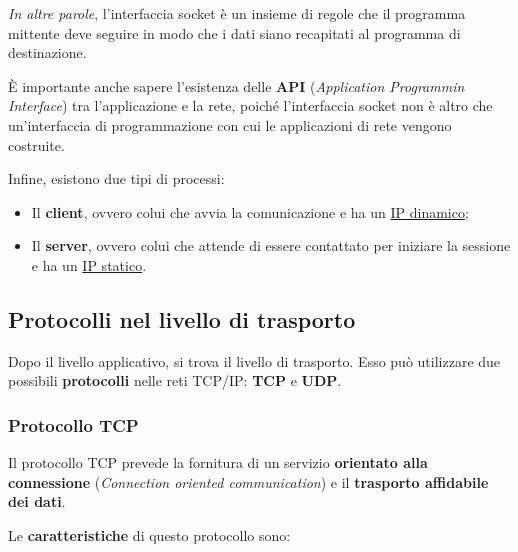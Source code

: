 \documentclass[a4paper]{article}
\begin{document}
	\noindent
	\emph{In altre parole}, l’interfaccia socket è un insieme di regole che il programma mittente deve seguire in modo che i dati siano recapitati al programma di destinazione.\newline
	
	\noindent
	È importante anche sapere l’esistenza delle \textbf{API} (\emph{Application Programmin Interface}) tra l’applicazione e la rete, poiché l’interfaccia socket non è altro che un’interfaccia di programmazione con cui le applicazioni di rete vengono costruite.\newline
	
	\noindent
	Infine, esistono due tipi di processi:
	
	\begin{itemize}
		\item Il \textbf{client}, ovvero colui che avvia la comunicazione e ha un \underline{IP dinamico};
		\item Il \textbf{server}, ovvero colui che attende di essere contattato per iniziare la sessione e ha un \underline{IP statico}.
	\end{itemize}

	\newpage
	
	\subsection{Protocolli nel livello di trasporto}
	
	Dopo il livello applicativo, si trova il livello di trasporto. Esso può utilizzare due possibili \textbf{protocolli} nelle reti TCP/IP: \textcolor{Red3}{\textbf{TCP}} e \textcolor{Red3}{\textbf{UDP}}.
	
	\subsubsection{Protocollo TCP}\label{protocollo TCP}
	
	Il protocollo TCP prevede la fornitura di un servizio \textbf{orientato alla connessione} (\emph{Connection oriented communication}) e il \textbf{trasporto affidabile dei dati}.\newline
	
	\noindent
	Le \textbf{caratteristiche} di questo protocollo sono:
	
\end{document}
